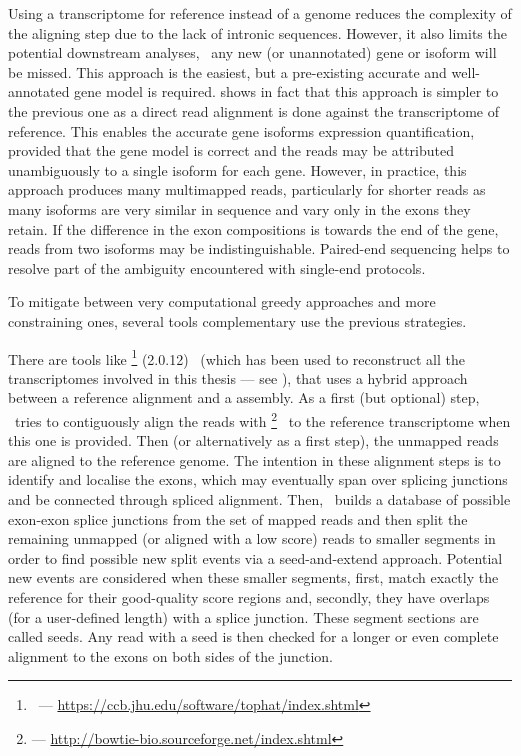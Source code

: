 Using a transcriptome for reference instead of a genome reduces the complexity
of the aligning step due to the lack of intronic sequences.
However, it also limits the potential downstream analyses,
\eg\ any new (or unannotated) gene or isoform will be missed.
This approach is the easiest, but a pre-existing
accurate and well-annotated gene model is required.
 shows in fact that this approach is simpler
to the previous one as a direct read alignment is done against the
transcriptome of reference.
This enables the accurate gene isoforms expression quantification,
provided that the gene model is correct and the reads may be
attributed unambiguously to a single isoform for each gene.
However, in practice, this approach produces many multimapped reads,
particularly for shorter reads as
many isoforms are very similar in sequence and vary only in the exons
they retain.
If the difference in the exon compositions is towards the end of the gene,
reads from two isoforms may be indistinguishable.
Paired-end sequencing helps to resolve part of the ambiguity encountered
with single-end protocols.

To mitigate between very computational greedy approaches and more constraining
ones, several tools complementary use the previous strategies.

There are tools like \toph\footnote{\toph\ ---
\href{https://ccb.jhu.edu/software/tophat/index.shtml}
{https://ccb.jhu.edu/software/tophat/index.shtml}} (2.0.12)~
(which has been used to reconstruct all the
transcriptomes involved in this thesis --- see ),
that uses a hybrid approach between a reference alignment and a 
assembly. As a first (but optional) step, \toph\ tries to contiguously
align the reads with \footnote{ ---
\href{http://bowtie-bio.sourceforge.net/index.shtml}%
{http://bowtie-bio.sourceforge.net/index.shtml}}~
to the reference transcriptome when this one is provided. Then
(or alternatively as a first step), the unmapped reads are aligned to the
reference genome. The intention in these alignment steps is to identify and
localise the exons, which may eventually span over splicing junctions and be
connected through spliced alignment. Then, \toph\ builds a database of
possible exon-exon splice junctions from the set of mapped reads and then split
the remaining unmapped (or aligned with a low score) reads to smaller segments
in order to find
possible new split events via a seed-and-extend approach. Potential new events
are considered when these smaller segments, first, match exactly the reference
for their good-quality score regions and, secondly, they have overlaps
(for a user-defined length) with a splice junction. These segment sections are
called seeds. Any read with a seed is then checked for a longer or even complete
alignment to the exons on both sides of the junction.

